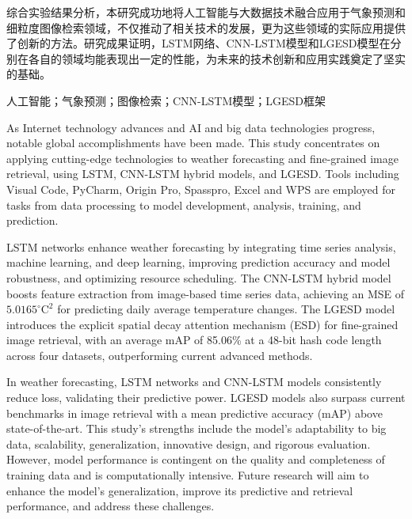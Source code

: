\begin{titlepage}
\begin{cnabstract}
综合实验结果分析，本研究成功地将人工智能与大数据技术融合应用于气象预测和细粒度图像检索领域，不仅推动了相关技术的发展，更为这些领域的实际应用提供了创新的方法。研究成果证明，LSTM网络、CNN-LSTM模型和LGESD模型在分别在各自的领域均能表现出一定的性能，为未来的技术创新和应用实践奠定了坚实的基础。



    \begin{keywordcn}
    人工智能；气象预测；图像检索；CNN-LSTM模型；LGESD框架
    \end{keywordcn}
    
    \addabstractcontentcn
    \end{cnabstract}
\end{titlepage}



\begin{titlepage}
    \makeabstractstarten
    \begin{enabstract}

    As Internet technology advances and AI and big data technologies progress, notable global accomplishments have been made. This study concentrates on applying cutting-edge technologies to weather forecasting and fine-grained image retrieval, using LSTM, CNN-LSTM hybrid models, and LGESD. Tools including Visual Code, PyCharm, Origin Pro, Spasspro, Excel and WPS are employed for tasks from data processing to model development, analysis, training, and prediction.

    LSTM networks enhance weather forecasting by integrating time series analysis, machine learning, and deep learning, improving prediction accuracy and model robustness, and optimizing resource scheduling. The CNN-LSTM hybrid model boosts feature extraction from image-based time series data, achieving an MSE of $5.0165^{\circ}\text{C}^2$ for predicting daily average temperature changes. The LGESD model introduces the explicit spatial decay attention mechanism (ESD) for fine-grained image retrieval, with an average mAP of 85.06\% at a 48-bit hash code length across four datasets, outperforming current advanced methods.

    In weather forecasting, LSTM networks and CNN-LSTM models consistently reduce loss, validating their predictive power. LGESD models also surpass current benchmarks in image retrieval with a mean predictive accuracy (mAP) above state-of-the-art. This study's strengths include the model's adaptability to big data, scalability, generalization, innovative design, and rigorous evaluation. However, model performance is contingent on the quality and completeness of training data and is computationally intensive. Future research will aim to enhance the model's generalization, improve its predictive and retrieval performance, and address these challenges.


\end{enabstract}
\end{titlepage}
